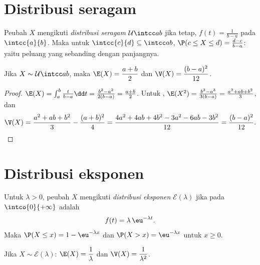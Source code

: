 \section{Distribusi seragam}

\begin{definition}\label{def:g12:contdist:uniform}
Peubah $X$ mengikuti \emph{distribusi seragam}
$\mathcal U\intcc ab$ jika  tetap,
$f(t) = \frac{1}{b-a}$ pada $\intcc{a}{b}$. Maka untuk
$\intcc{c}{d} \subseteq \intcc ab$,
$\P(c \leq X \leq d) = \frac{d - c}{b - a}$: yaitu peluang yang sebanding dengan
panjangnya.
\end{definition}

\begin{proposition}\label{prop:g12:contdist:uniformmoments}
Jika $X \sim \mathcal U\intcc ab$, maka
$\E(X) = \dfrac{a+b}{2}$ dan $\V(X) = \dfrac{(b-a)^2}{12}$.
\end{proposition}

\begin{proof}
$\E(X) = \int_a^b \frac{t}{b-a}\dd t
= \frac{b^2 - a^2}{2(b-a)} = \frac{a+b}{2}$. Untuk ,
$\E(X^2) = \frac{b^3 - a^3}{3(b-a)} = \frac{a^2 + ab + b^2}{3}$, dan
\[
\V(X) = \frac{a^2 + ab + b^2}{3} - \frac{(a+b)^2}{4}
= \frac{4a^2 + 4ab + 4b^2 - 3a^2 - 6ab - 3b^2}{12}
= \frac{(b - a)^2}{12}. \qedhere
\]
\end{proof}

\section{Distribusi eksponen}

\begin{definition}\label{def:g12:contdist:expo}
Untuk $\lambda > 0$, peubah $X$ mengikuti \emph{distribusi
eksponen} $\mathcal E(\lambda)$ jika
 pada $\intco{0}{+\infty}$ adalah
\[
f(t) = \lambda\,\eu^{-\lambda t}.
\]
Maka $\P(X \leq x) = 1 - \eu^{-\lambda x}$ dan
$\P(X > x) = \eu^{-\lambda x}$ untuk $x \geq 0$.
\end{definition}

\begin{proposition}\label{prop:g12:contdist:expomoments}
Jika $X \sim \mathcal E(\lambda)$:
$\E(X) = \dfrac{1}{\lambda}$ dan $\V(X) = \dfrac{1}{\lambda^2}$.
\end{proposition}

